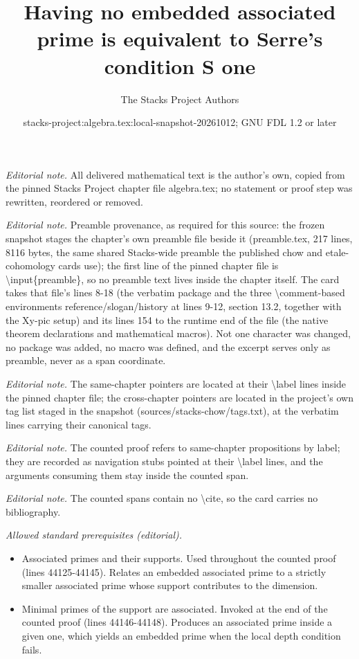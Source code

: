 \documentclass[10pt,a4paper]{amsart}
\title{Having no embedded associated prime is equivalent to Serre's condition S one}
\author{The Stacks Project Authors}
\date{stacks-project:algebra.tex:local-snapshot-20261012; GNU FDL 1.2 or later}
\theoremstyle{plain}
\theoremstyle{definition}
\theoremstyle{remark}
\numberwithin{equation}{subsection}
\begin{document}
\maketitle
\noindent\textit{Editorial note.} All delivered mathematical text is the author's own, copied from the pinned Stacks Project chapter file algebra.tex; no statement or proof step was rewritten, reordered or removed.\par\medskip
\noindent\textit{Editorial note.} Preamble provenance, as required for this source: the frozen snapshot stages the chapter's own preamble file beside it (preamble.tex, 217 lines, 8116 bytes, the same shared Stacks-wide preamble the published chow and etale-cohomology cards use); the first line of the pinned chapter file is \textbackslash{}input\{preamble\}, so no preamble text lives inside the chapter itself. The card takes that file's lines 8-18 (the verbatim package and the three \textbackslash{}comment-based environments reference/slogan/history at lines 9-12, section 13.2, together with the Xy-pic setup) and its lines 154 to the runtime end of the file (the native theorem declarations and mathematical macros). Not one character was changed, no package was added, no macro was defined, and the excerpt serves only as preamble, never as a span coordinate.\par\medskip
\noindent\textit{Editorial note.} The same-chapter pointers are located at their \textbackslash{}label lines inside the pinned chapter file; the cross-chapter pointers are located in the project's own tag list staged in the snapshot (sources/stacks-chow/tags.txt), at the verbatim lines carrying their canonical tags.\par\medskip
\noindent\textit{Editorial note.} The counted proof refers to same-chapter propositions by label; they are recorded as navigation stubs pointed at their \textbackslash{}label lines, and the arguments consuming them stay inside the counted span.\par\medskip
\noindent\textit{Editorial note.} The counted spans contain no \textbackslash{}cite, so the card carries no bibliography.\par\medskip
\noindent\textit{Allowed standard prerequisites (editorial).}\begin{itemize}
\item Associated primes and their supports. Used throughout the counted proof (lines 44125-44145). Relates an embedded associated prime to a strictly smaller associated prime whose support contributes to the dimension.
\item Minimal primes of the support are associated. Invoked at the end of the counted proof (lines 44146-44148). Produces an associated prime inside a given one, which yields an embedded prime when the local depth condition fails.
\end{itemize}\medskip
\end{document}
